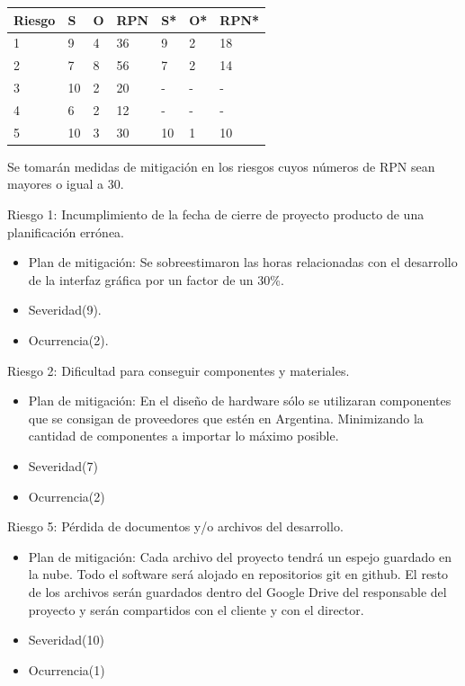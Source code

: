 \documentclass[11pt]{charter}
\begin{document}
\begin{table}[htpb]
\centering
\begin{tabularx}{\linewidth}{@{}|X|X|X|X|X|X|X|@{}}
\hline
\rowcolor[HTML]{C0C0C0} 
Riesgo	& S		& O	& RPN	& S*		& O* & RPN* \\ \hline
1 		& 9		& 4	&  36	& 9		& 2  & 18	\\ \hline
2		& 7		& 8	&  56	& 7		& 2  & 14	\\ \hline
3		& 10		& 2	&  20	& -		& -  & -		\\ \hline
4		& 6		& 2	&  12	& -		& -  & -		\\ \hline
5		& 10		& 3	&  30	& 10		& 1  & 10	\\ \hline
\end{tabularx}%
\end{table}

Se tomarán medidas de mitigación en los riesgos cuyos números de RPN sean mayores o igual a 30.

Riesgo 1: Incumplimiento de la fecha de cierre de proyecto producto de una planificación errónea.
\begin{itemize}
\item Plan de mitigación: Se sobreestimaron las horas relacionadas con el desarrollo de la interfaz gráfica por un factor de un 30\%.
\item Severidad(9).
\item Ocurrencia(2).
\end{itemize}  

Riesgo 2: Dificultad para conseguir componentes y materiales.
\begin{itemize}
\item Plan de mitigación: En el diseño de hardware sólo se utilizaran componentes que se consigan de proveedores que estén en Argentina. Minimizando la cantidad de componentes a importar lo máximo posible.
\item Severidad(7)
\item Ocurrencia(2)
\end{itemize}

Riesgo 5: Pérdida de documentos y/o archivos del desarrollo.
\begin{itemize}
\item Plan de mitigación: Cada archivo del proyecto tendrá un espejo guardado en la nube. Todo el software será alojado en repositorios git en github. El resto de los archivos serán guardados dentro del Google Drive del responsable del proyecto y serán compartidos con el cliente y con el director.
\item Severidad(10)
\item Ocurrencia(1)
\end{itemize}
\end{document}
